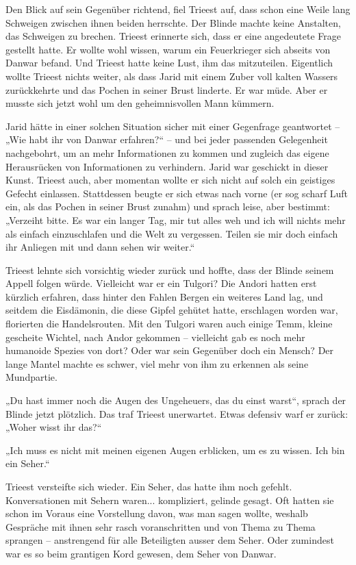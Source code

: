 Den Blick auf sein Gegenüber richtend, fiel Trieest auf, dass schon eine Weile lang Schweigen zwischen ihnen beiden herrschte. Der Blinde machte keine Anstalten, das Schweigen zu brechen. Trieest erinnerte sich, dass er eine angedeutete Frage gestellt hatte. Er wollte wohl wissen, warum ein Feuerkrieger sich abseits von Danwar befand. Und Trieest hatte keine Lust, ihm das mitzuteilen. Eigentlich wollte Trieest nichts weiter, als dass Jarid mit einem Zuber voll kalten Wassers zurückkehrte und das Pochen in seiner Brust linderte. Er war müde. Aber er musste sich jetzt wohl um den geheimnisvollen Mann kümmern.

Jarid hätte in einer solchen Situation sicher mit einer Gegenfrage geantwortet – „Wie habt ihr von Danwar erfahren?“ – und bei jeder passenden Gelegenheit nachgebohrt, um an mehr Informationen zu kommen und zugleich das eigene Herausrücken von Informationen zu verhindern. Jarid war geschickt in dieser Kunst. Trieest auch, aber momentan wollte er sich nicht auf solch ein geistiges Gefecht einlassen. Stattdessen beugte er sich etwas nach vorne (er sog scharf Luft ein, als das Pochen in seiner Brust zunahm) und sprach leise, aber bestimmt: „Verzeiht bitte. Es war ein langer Tag, mir tut alles weh und ich will nichts mehr als einfach einzuschlafen und die Welt zu vergessen. Teilen sie mir doch einfach ihr Anliegen mit und dann sehen wir weiter.“

Trieest lehnte sich vorsichtig wieder zurück und hoffte, dass der Blinde seinem Appell folgen würde. Vielleicht war er ein Tulgori? Die Andori hatten erst kürzlich erfahren, dass hinter den Fahlen Bergen ein weiteres Land lag, und seitdem die Eisdämonin, die diese Gipfel gehütet hatte, erschlagen worden war, florierten die Handelsrouten. Mit den Tulgori waren auch einige Temm, kleine gescheite Wichtel, nach Andor gekommen – vielleicht gab es noch mehr humanoide Spezies von dort? Oder war sein Gegenüber doch ein Mensch? Der lange Mantel machte es schwer, viel mehr von ihm zu erkennen als seine Mundpartie.

„Du hast immer noch die Augen des Ungeheuers, das du einst warst“, sprach der Blinde jetzt plötzlich. Das traf Trieest unerwartet. Etwas defensiv warf er zurück: „Woher wisst ihr das?“

„Ich muss es nicht mit meinen eigenen Augen erblicken, um es zu wissen. Ich bin ein Seher.“

Trieest versteifte sich wieder. Ein Seher, das hatte ihm noch gefehlt. Konversationen mit Sehern waren... kompliziert, gelinde gesagt. Oft hatten sie schon im Voraus eine Vorstellung davon, was man sagen wollte, weshalb Gespräche mit ihnen sehr rasch voranschritten und von Thema zu Thema sprangen – anstrengend für alle Beteiligten ausser dem Seher. Oder zumindest war es so beim grantigen Kord gewesen, dem Seher von Danwar.

